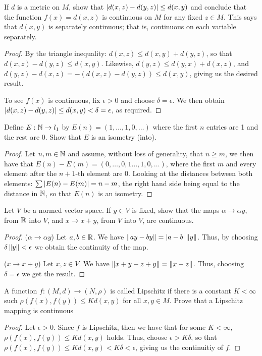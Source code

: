 \begin{exercise}{20}
If $d$ is a metric on $M$, show that $\left\lvert d(x,z)-d(y,z)\right\rvert \leq d(x,y)$ and conclude that the function $f(x)=d(x,z)$ is continuous on $M$ for any fixed $z\in M$.
This says that $d(x,y)$ is separately continuous;
that is, continuous on each variable separately.
\end{exercise}
\begin{proof}
By the triangle inequality: 
$d(x,z) \leq d(x,y) + d(y,z)$, so that 
$d(x,z) - d(y,z) \leq d(x,y)$.
Likewise,
$d(y,z) \leq d(y,x) + d(x,z)$, and
$d(y,z) - d(x,z) = -(d(x,z) - d(y,z)) \leq d(x,y)$,
giving us the desired result.

To see $f(x)$ is continuous, fix $\epsilon>0$ and choose $\delta=\epsilon$.
We then obtain $\left\lvert d(x,z)-d(y,z)\right\rvert \leq d(x,y) < \delta = \epsilon$, as required.
\end{proof} 

\begin{exercise}{22}
Define $E:\mathbb{N}\to l_1$ by $E(n)=(1,\dots,1,0,\dots)$ where the first $n$ entries are 1 and the rest are 0.
Show that $E$ is an isometry (into).
\end{exercise}
\begin{proof}
Let $n,m\in\mathbb{N}$ and assume, without loss of generality, that $n\geq m$, we then have that $E(n)-E(m)=(0,\dots,0,1\dots,1,0,\dots)$, where the first $m$ and every element after the $n+1$-th element are 0.
Looking at the distances between both elements:
$\sum\left\lvert E(n)-E(m)\right\rvert =n-m$, the right hand side being equal to the distance in $\mathbb{N}$, so that $E(n)$ is an isometry.
\end{proof} 

\begin{exercise}{24}
Let $V$ be a normed vector space.
If $y \in V$ is fixed, show that the maps $\alpha\to\alpha y$, from $\mathbb{R}$ into $V$, and $x\to x+y$, from $V$ into $V$, are continuous.
\end{exercise}
\begin{proof}
($\alpha\to\alpha y$)
Let $a,b\in \mathbb{R}$.
We have $\left\lVert ay -by\right\rVert =\left\lvert a-b\right\rvert\left\lVert y\right\rVert$.
Thus, by choosing $\delta\left\lVert y\right\rVert<\epsilon$ we obtain the continuity of the map.

($x\to x+y$)
Let $x,z\in V$.
We have $\left\lVert x+y -z+y\right\rVert=\left\lVert x-z\right\rVert$.
Thus, choosing $\delta=\epsilon$ we get the result.
\end{proof} 

\begin{exercise}{25}
A function $f:(M,d)\to(N,\rho)$ is called Lipschitz if there is a constant $K<\infty$ such $\rho(f(x),f(y))\leq Kd(x,y)$ for all $x,y\in M$.
Prove that a Lipschitz mapping is continuous
\end{exercise}
\begin{proof}
Let $\epsilon>0$.
Since $f$ is Lipschitz, then we have that for some $K<\infty$, $\rho(f(x),f(y)) \leq Kd(x,y)$ holds.
Thus, choose $\epsilon>K\delta$, so that $\rho(f(x),f(y)) \leq Kd(x,y) < K\delta < \epsilon$, giving us the continuitiy of $f$.
\end{proof} 

